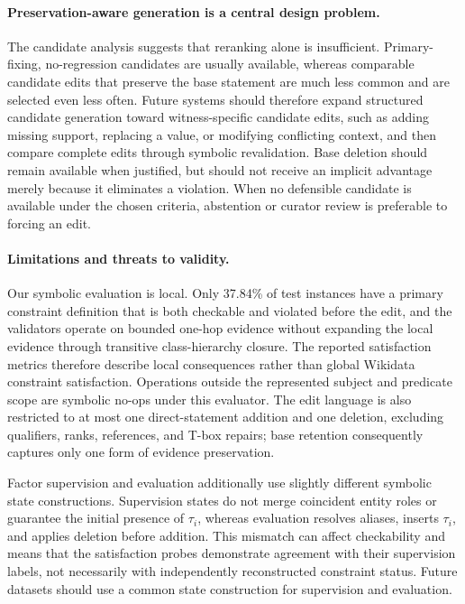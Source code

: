 \documentclass[a4paper,UKenglish,cleveref,autoref,thm-restate]{tgdk-v2021}
\begin{document}
\paragraph*{Preservation-aware generation is a central design problem.} The candidate analysis suggests that reranking alone is insufficient. Primary-fixing, no-regression candidates are usually available, whereas comparable candidate edits that preserve the base statement are much less common and are selected even less often. Future systems should therefore expand structured candidate generation toward witness-specific candidate edits, such as adding missing support, replacing a value, or modifying conflicting context, and then compare complete edits through symbolic revalidation. Base deletion should remain available when justified, but should not receive an implicit advantage merely because it eliminates a violation. When no defensible candidate is available under the chosen criteria, abstention or curator review is preferable to forcing an edit.

\paragraph*{Limitations and threats to validity.} Our symbolic evaluation is local. Only 37.84\% of test instances have a primary constraint definition that is both checkable and violated before the edit, and the validators operate on bounded one-hop evidence without expanding the local evidence through transitive class-hierarchy closure. The reported satisfaction metrics therefore describe local consequences rather than global Wikidata constraint satisfaction. Operations outside the represented subject and predicate scope are symbolic no-ops under this evaluator. The edit language is also restricted to at most one direct-statement addition and one deletion, excluding qualifiers, ranks, references, and T-box repairs; base retention consequently captures only one form of evidence preservation. 

Factor supervision and evaluation additionally use slightly different symbolic state constructions. Supervision states do not merge coincident entity roles or guarantee the initial presence of \(\tau_i\), whereas evaluation resolves aliases, inserts \(\tau_i\), and applies deletion before addition. This mismatch can affect checkability and means that the satisfaction probes demonstrate agreement with their supervision labels, not necessarily with independently reconstructed constraint status. Future datasets should use a common state construction for supervision and evaluation. 
\end{document}
